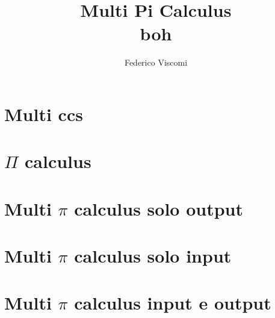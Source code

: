 \documentclass[14pt, a4paper, draft]{book}
\title{Multi Pi Calculus\\[4mm]\small{boh}}
\author{Federico Viscomi}
\newcommand{\openrigthchapter}[1]{\chapter{#1}}
\begin{document}
\pagestyle{empty}




\tableofcontents

%

\openrigthchapter{Multi ccs}


\openrigthchapter{$\Pi$ calculus}


\openrigthchapter{Multi $\pi$ calculus solo output}


\openrigthchapter{Multi $\pi$ calculus solo input}


\openrigthchapter{Multi $\pi$ calculus input e output}


% 


%

\printindex


\end{document}
